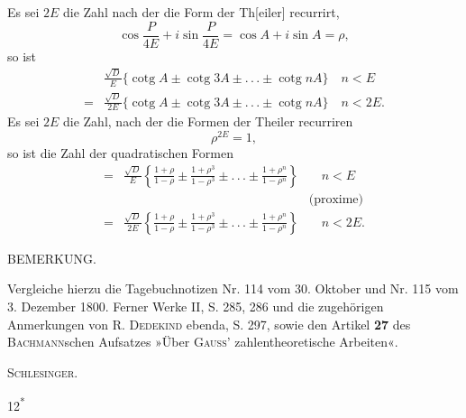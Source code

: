 \NoSourceHead
{}
\noindent\hspace*{\parindent}Es sei $2E$ die Zahl nach der die Form der Th[eiler] recurrirt,
\[
\cos\frac{P}{4E}+i\sin\frac{P}{4E}=\cos A+i\sin A=\rho,
\]
\noindent so ist
\[
\begin{aligned}
&\frac{\surd D}{E}\{\operatorname{cotg}A\pm\operatorname{cotg}3A\pm.\,.\,.\pm\operatorname{cotg}nA\}\quad n<E\\[4pt]
={}&\frac{\surd D}{2E}\{\operatorname{cotg}A\pm\operatorname{cotg}3A\pm.\,.\,.\pm\operatorname{cotg}nA\}\quad n<2E.
\end{aligned}
\]
\ClosingRule
{}
\noindent\hspace*{\parindent}Es sei $2E$ die Zahl, nach der die Formen der Theiler recurriren
\[
\rho^{2E}=1,
\]
\noindent so ist die Zahl der quadratischen Formen
\[
\begin{aligned}
={}&\frac{\surd D}{E}\left\{\tfrac{1+\rho}{1-\rho}\pm\tfrac{1+\rho^3}{1-\rho^3}\pm.\,.\,.\pm\tfrac{1+\rho^n}{1-\rho^n}\right\}&\quad n<E\\
&&\text{(proxime)}\\[4pt]
={}&\frac{\surd D}{2E}\left\{\tfrac{1+\rho}{1-\rho}\pm\tfrac{1+\rho^3}{1-\rho^3}\pm.\,.\,.\pm\tfrac{1+\rho^n}{1-\rho^n}\right\}&\quad n<2E.
\end{aligned}
\]
\begin{center}\small BEMERKUNG.\end{center}
\begingroup\small
\noindent\hspace*{\parindent}Vergleiche hierzu die Tagebuchnotizen Nr. 114 vom 30. Oktober und Nr. 115 vom 3. Dezember 1800.
Ferner Werke II, S. 285, 286 und die zugehörigen Anmerkungen von R. \textsc{Dedekind} ebenda, S. 297,
sowie den Artikel \textbf{27} des \textsc{Bachmann}schen Aufsatzes »Über \textsc{Gauss}’ zahlentheoretische Arbeiten«.
\par\hfill\textsc{Schlesinger.}\par
\endgroup
\ClosingRule
\par\smallskip\noindent\hfill{\small 12\textsuperscript{*}}\par
\clearpage
